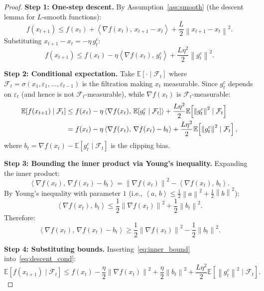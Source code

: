 \documentclass[11pt]{article}
\theoremstyle{definition}
\newcommand{\E}{\mathbb{E}}
\newcommand{\norm}[1]{\left\| #1 \right\|}
\newcommand{\inner}[2]{\left\langle #1,\, #2 \right\rangle}
\newcommand{\Filt}{\mathcal{F}}
\begin{document}
\begin{proof}
\textbf{Step 1: One-step descent.}
By Assumption~\ref{ass:smooth} (the descent lemma for $L$-smooth functions):
\begin{equation}\label{eq:descent_raw}
  f(x_{t+1}) \leq f(x_t) + \inner{\nabla f(x_t)}{x_{t+1} - x_t}
    + \frac{L}{2}\norm{x_{t+1} - x_t}^2.
\end{equation}
Substituting $x_{t+1} - x_t = -\eta\, g_t^c$:
\begin{equation}\label{eq:descent_clip}
  f(x_{t+1}) \leq f(x_t) - \eta\inner{\nabla f(x_t)}{g_t^c}
    + \frac{L\eta^2}{2}\norm{g_t^c}^2.
\end{equation}

\medskip
\textbf{Step 2: Conditional expectation.}
Take $\E[\cdot \mid \Filt_t]$ where $\Filt_t = \sigma(x_1, \varepsilon_1,
\ldots, \varepsilon_{t-1})$ is the filtration making $x_t$ measurable.
Since $g_t^c$ depends on $\varepsilon_t$ (and hence is not $\Filt_t$-measurable),
while $\nabla f(x_t)$ is $\Filt_t$-measurable:
\begin{align}
  \E[f(x_{t+1}) \mid \Filt_t]
  &\leq f(x_t) - \eta\inner{\nabla f(x_t)}{\E[g_t^c \mid \Filt_t]}
    + \frac{L\eta^2}{2}\E\!\left[\norm{g_t^c}^2 \mid \Filt_t\right] \notag\\
  &= f(x_t) - \eta\inner{\nabla f(x_t)}{\nabla f(x_t) - b_t}
    + \frac{L\eta^2}{2}\E\!\left[\norm{g_t^c}^2 \mid \Filt_t\right],
    \label{eq:descent_cond}
\end{align}
where $b_t = \nabla f(x_t) - \E[g_t^c \mid \Filt_t]$ is the clipping bias.

\medskip
\textbf{Step 3: Bounding the inner product via Young's inequality.}
Expanding the inner product:
\[
  \inner{\nabla f(x_t)}{\nabla f(x_t) - b_t}
  = \norm{\nabla f(x_t)}^2 - \inner{\nabla f(x_t)}{b_t}.
\]
By Young's inequality with parameter $1$ (i.e., $\inner{a}{b} \leq
\frac{1}{2}\norm{a}^2 + \frac{1}{2}\norm{b}^2$):
\[
  \inner{\nabla f(x_t)}{b_t}
  \leq \frac{1}{2}\norm{\nabla f(x_t)}^2 + \frac{1}{2}\norm{b_t}^2.
\]
Therefore:
\begin{equation}\label{eq:inner_bound}
  \inner{\nabla f(x_t)}{\nabla f(x_t) - b_t}
  \geq \frac{1}{2}\norm{\nabla f(x_t)}^2 - \frac{1}{2}\norm{b_t}^2.
\end{equation}

\medskip
\textbf{Step 4: Substituting bounds.}
Inserting~\eqref{eq:inner_bound} into~\eqref{eq:descent_cond}:
\begin{equation}\label{eq:descent_bv}
  \E[f(x_{t+1}) \mid \Filt_t]
  \leq f(x_t) - \frac{\eta}{2}\norm{\nabla f(x_t)}^2
    + \frac{\eta}{2}\norm{b_t}^2
    + \frac{L\eta^2}{2}\E\!\left[\norm{g_t^c}^2 \mid \Filt_t\right].
\end{equation}


\end{proof}
\end{document}

